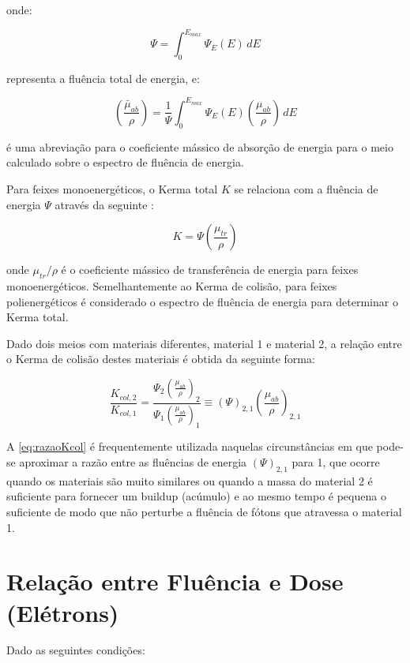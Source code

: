 \documentclass[11pt,a4paper]{article}
\begin{document}
		\noindent onde:

			$$\Psi = \int_{0}^{E_{max}} \Psi_E(E) \, dE$$

		\noindent representa a fluência total de energia, e:

			$$\left(\frac{\bar{\mu}_{ab}}{\rho}\right)
			= \frac{1}{\Psi} \int_{0}^{E_{max}} \Psi_E(E) \left(\frac{\mu_{ab}}{\rho}\right)  \,dE
			$$

		\noindent é uma abreviação para o coeficiente mássico de absorção de energia para o meio calculado sobre o espectro de fluência de energia.


		Para feixes monoenergéticos, o Kerma total $K$ se relaciona com a fluência de energia $\Psi$ através da seguinte  :

		\begin{equation}
			K = \Psi \left(\frac{\mu_{tr}}{\rho}\right)
		\end{equation}

		\noindent onde $\mu_{tr}/\rho$ é o coeficiente mássico de transferência de energia para feixes monoenergéticos. Semelhantemente ao Kerma de colisão, para feixes polienergéticos é considerado o espectro de fluência de energia para determinar o Kerma total.


		Dado dois meios com materiais diferentes, material 1 e material 2, a relação entre o Kerma de colisão destes materiais é obtida da seguinte forma:

		\begin{equation}
			\frac{K_{col,2}}{K_{col, 1}} = \frac{\Psi_2 \left(\frac{\mu_{ab}}{\rho}\right)_2}{\Psi_1 \left(\frac{\mu_{ab}}{\rho}\right)_1}
			\equiv \left(\Psi \right)_{2,1}\left(\frac{\mu_{ab}}{\rho}\right)_{2,1}
			\label{eq:razaoKcol}
		\end{equation}

		A   \ref{eq:razaoKcol} é frequentemente utilizada naquelas circunstâncias em que pode-se aproximar a razão entre as fluências de energia $(\Psi)_{2,1}$ para 1, que ocorre quando os materiais são muito similares ou quando a massa do material 2 é suficiente para fornecer um buildup (acúmulo) e ao mesmo tempo é pequena o suficiente de modo que não perturbe a fluência de fótons que atravessa o material 1.


	\section{Relação entre Fluência e Dose (Elétrons)}

		Dado as seguintes condições:
\end{document}
